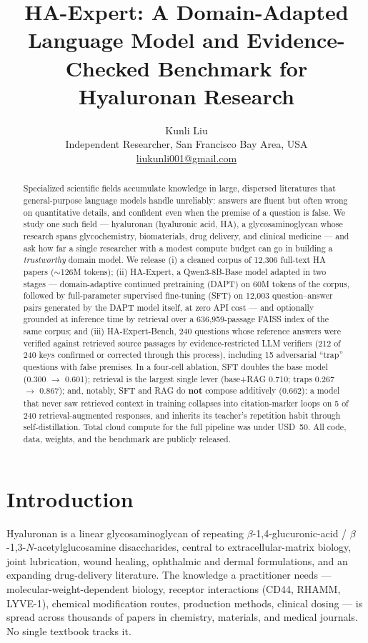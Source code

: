\documentclass[11pt]{article}
\title{HA-Expert: A Domain-Adapted Language Model and Evidence-Checked
Benchmark for Hyaluronan Research}
\author{Kunli Liu\\
Independent Researcher, San Francisco Bay Area, USA\\
\href{mailto:liukunli001@gmail.com}{liukunli001@gmail.com}}
\date{}
\begin{document}
\maketitle

\begin{abstract}
Specialized scientific fields accumulate knowledge in large, dispersed
literatures that general-purpose language models handle unreliably: answers
are fluent but often wrong on quantitative details, and confident even when
the premise of a question is false. We study one such field --- hyaluronan
(hyaluronic acid, HA), a glycosaminoglycan whose research spans
glycochemistry, biomaterials, drug delivery, and clinical medicine --- and
ask how far a single researcher with a modest compute budget can go in
building a \emph{trustworthy} domain model. We release (i) a cleaned corpus
of 12,306 full-text HA papers ($\sim$126M tokens); (ii) HA-Expert, a
Qwen3-8B-Base model adapted in two stages --- domain-adaptive continued
pretraining (DAPT) on 60M tokens of the corpus, followed by full-parameter
supervised fine-tuning (SFT) on 12,003 question--answer pairs generated by
the DAPT model itself, at zero API cost --- and optionally grounded at
inference time by retrieval over a 636,959-passage FAISS index of the same
corpus; and (iii) HA-Expert-Bench, 240 questions whose reference answers
were verified against retrieved source passages by evidence-restricted LLM
verifiers (212 of 240 keys confirmed or corrected through this process),
including 15 adversarial ``trap'' questions with false premises. In a
four-cell ablation, SFT doubles the base model (0.300 $\rightarrow$ 0.601);
retrieval is the largest single lever (base+RAG 0.710; traps
0.267 $\rightarrow$ 0.867); and, notably, SFT and RAG do \textbf{not}
compose additively (0.662): a model that never saw retrieved context in
training collapses into citation-marker loops on 5 of 240
retrieval-augmented responses, and inherits its teacher's repetition habit
through self-distillation. Total cloud compute for the full pipeline was
under USD~50. All code, data, weights, and the benchmark are publicly
released.
\end{abstract}

\section{Introduction}

Hyaluronan is a linear glycosaminoglycan of repeating
$\beta$-1,4-glucuronic-acid / $\beta$-1,3-$N$-acetylglucosamine
disaccharides, central to extracellular-matrix biology, joint lubrication,
wound healing, ophthalmic and dermal formulations, and an expanding
drug-delivery literature. The knowledge a practitioner needs ---
molecular-weight-dependent biology, receptor interactions (CD44, RHAMM,
LYVE-1), chemical modification routes, production methods, clinical
dosing --- is spread across thousands of papers in chemistry, materials,
and medical journals. No single textbook tracks it.
\end{document}
